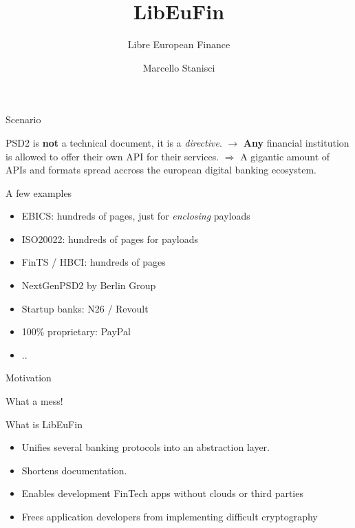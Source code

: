 \documentclass[pdf]{beamer}
\title{LibEuFin}
\subtitle{Libre European Finance}
\author{Marcello Stanisci}
\begin{document}
\begin{frame}
  \titlepage
\end{frame}

\begin{frame}{Scenario}

  \begin{center}
  PSD2 is \textbf{not} a technical document, \iffalse (EXPLAIN) \fi
  it is a {\it directive}. \iffalse (EXPLAIN) \fi \newline
  $\rightarrow$ \textbf{Any} financial institution is allowed to offer their
  own API for their services. \newline
  $\Rightarrow$ A gigantic amount of APIs and formats spread accross the
  european digital banking ecosystem.
  \end{center}
\end{frame}

\begin{frame}{A few examples}
  \begin{itemize}
    \item EBICS: hundreds of pages, just for {\it enclosing} payloads
    \item ISO20022: hundreds of pages for payloads
    \item FinTS / HBCI: hundreds of pages
    \item NextGenPSD2 by Berlin Group 
    \item Startup banks: N26 / Revoult
    \item 100\% proprietary: PayPal
    \item ..
  \end{itemize}
\end{frame}

\begin{frame}{Motivation}
  \begin{center}
  What a mess!
  \end{center}
\end{frame}

\begin{frame}{What is LibEuFin}
  \begin{itemize}
  \item Unifies several banking protocols into an abstraction layer.
  \item Shortens documentation.
  \item Enables development FinTech apps without clouds or third parties
  \item Frees application developers from implementing difficult cryptography
  \end{itemize}
\end{frame}
\end{document}
